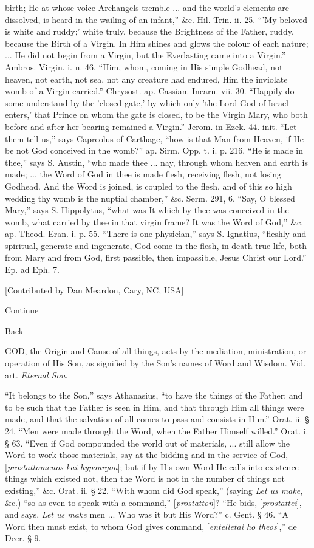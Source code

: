 birth; He at whose voice Archangels tremble ... and the world's
elements are dissolved, is heard in the wailing of an infant,'' \&c.
Hil. Trin. ii. 25. ``'My beloved is white and ruddy;' white truly,
because the Brightness of the Father, ruddy, because the Birth of a
Virgin. In Him shines and glows the colour of each nature; ... He did
not begin from a Virgin, but the Everlasting came into a Virgin.''
Ambros. Virgin. i. n. 46. ``Him, whom, coming in His simple Godhead,
not heaven, not earth, not sea, not any creature had endured, Him the inviolate womb of a Virgin carried.'' Chrysost. ap. Cassian.
Incarn. vii. 30. ``Happily do some understand by the 'closed gate,' by
which only 'the Lord God of Israel enters,' that Prince on whom the
gate is closed, to be the Virgin Mary, who both before and after her
bearing remained a Virgin.'' Jerom. in Ezek. 44. init. ``Let them tell
us,'' says Capreolus of Carthage, ``how is that Man from Heaven, if He
be not God conceived in the womb?'' ap. Sirm. Opp. t. i. p. 216. ``He is
made in thee,'' says S. Austin, ``who made thee ... nay, through whom
heaven and earth is made; ... the Word of God in thee is made flesh,
receiving flesh, not losing Godhead. And the Word is joined, is
coupled to the flesh, and of this so high wedding thy womb is the
nuptial chamber,'' \&c. Serm. 291, 6. ``Say, O blessed Mary,'' says S.
Hippolytus, ``what was It which by thee was conceived in the womb, what
carried by thee in that virgin frame? It was the Word of God,'' \&c.
ap. Theod. Eran. i. p. 55. ``There is one physician,'' says S. Ignatius,
``fleshly and spiritual, generate and ingenerate, God come in the
flesh, in death true life, both from Mary and from God, first passible,
then impassible, Jesus Christ our Lord.'' Ep. ad Eph. 7.

[Contributed by Dan Meardon, Cary, NC, USA]

Continue

Back


GOD,
the Origin and Cause of all things, acts by the mediation,
ministration, or operation of His Son, as signified by the Son's names
of Word and Wisdom. Vid. art. \emph{Eternal Son}.

``It
belongs to the Son,'' says Athanasius, ``to have the things of the
Father; and to be such that the Father is seen in Him, and that
through Him all things were made, and that the salvation of all comes
to pass and consists in Him.'' Orat. ii. § 24. ``Men were made through
the Word, when the Father Himself willed.'' Orat. i. § 63. ``Even if
God compounded the world out of materials, ... still allow the Word to
work those materials, say at the bidding and in the service of God, [\emph{prostattomenos
kai hypourg\={o}n}]; but if by His own Word He calls into
existence things which existed not, then the Word is not in the number
of things not existing,'' \&c. Orat. ii. § 22. ``With whom did God
speak,'' (saying \emph{Let us make}, \&c.) ``so as even to speak with
a command,'' [\emph{prostatt\={o}n}]? ``He bids, [\emph{prostattei}],
and says, \emph{Let us make} men ... Who was it but His Word?'' c.
Gent. § 46. ``A Word then must exist, to whom God gives command, [\emph{entelletai
ho theos}],'' de Decr. § 9.

